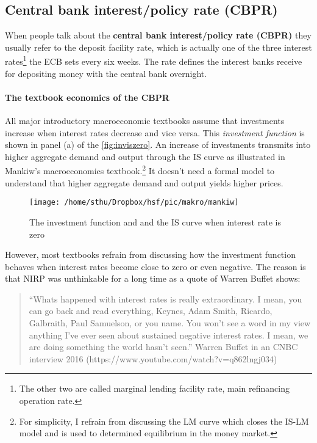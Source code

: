 \subsection{Central bank interest/policy rate (CBPR)}

When people talk about the \textbf{central bank interest/policy rate (CBPR)} they usually refer to the deposit facility rate, which is actually one of the three interest rates\footnote{The other two are called marginal lending facility rate, main refinancing operation rate.} the ECB sets every six weeks. The rate defines the interest banks receive for depositing money with the central bank overnight. 


\paragraph{The textbook economics of the CBPR}
All major introductory macroeconomic textbooks assume that investments increase when interest rates decrease and vice versa. This \textit{investment function} is shown in panel (a) of the \autoref{fig:inviszero}. An increase of investments transmits into higher aggregate demand and output through the IS curve as illustrated in Mankiw's macroeconomics textbook.\footnote{For simplicity, I refrain from discussing the LM curve which closes the IS-LM model and  is used to determined equilibrium in the money market.} It doesn't need a formal model to understand that higher aggregate demand and output yields higher prices.

\begin{figure}
	\begin{center}
		\texttt{[image: /home/sthu/Dropbox/hsf/pic/makro/mankiw]}
	\end{center}
	\caption{The investment function and and the IS curve when interest rate is zero}\label{fig:inviszero}
\end{figure}


However, most textbooks refrain from discussing how the investment function behaves when interest rates become close to zero or even negative. The reason is that NIRP was unthinkable for a long time as a quote of Warren Buffet shows:

\begin{quotation}
``Whats happened with interest rates is really extraordinary. I mean, you can go back and read everything, Keynes, Adam Smith, Ricardo, Galbraith, Paul Samuelson, or you name. You won't see a word in my view anything I've ever seen about sustained negative interest rates. I mean, we are doing something the world hasn't seen.'' Warren Buffet in an CNBC interview 2016 (https://www.youtube.com/watch?v=q862lngj034)
\end{quotation} 



